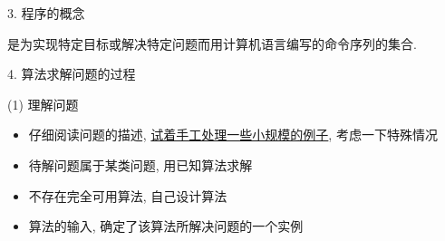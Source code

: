 \documentclass[fontset=fandol,UTF8,12pt,aspectratio=169,fleqn]{beamer}
\begin{document}
\begin{frame}{3. 程序的概念}
\begin{definition}[程序(Program)]
是为实现特定目标或解决特定问题而用计算机语言编写的命令序列的集合.  
\end{definition}
\end{frame}


\begin{frame}{4. 算法求解问题的过程}
\begin{figure}
  \centering
\end{figure}
\end{frame}

\begin{frame}{(1) 理解问题}
\begin{itemize}[<+-|alert@+>]
\item 仔细阅读问题的描述, \underline{试着手工处理一些小规模的例子}, 考虑一下特殊情况  
\item 待解问题属于某类问题, 用已知算法求解   
\item 不存在完全可用算法, 自己设计算法   
\item 算法的输入, 确定了该算法所解决问题的一个实例   
\end{itemize}
\end{frame}
\end{document}
